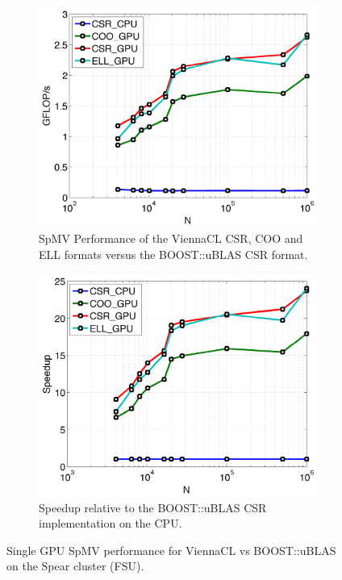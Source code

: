 \documentclass{report}
\begin{document}
\begin{figure}
\centering
\begin{subfigure}[t]{0.48\textwidth}
\centering
\includegraphics[width=1.0\textwidth]{../figures/spear_results/spmv/spmv_vcl_gflops-eps-converted-to.pdf}
\caption{SpMV Performance of the ViennaCL CSR, COO and ELL formats versus the BOOST::uBLAS CSR format. }
\label{fig:spear_vcl_gflops}
\end{subfigure} 
\begin{subfigure}[t]{0.48\textwidth}
\centering
\includegraphics[width=1.0\textwidth]{../figures/spear_results/spmv/spmv_vcl_speedup-eps-converted-to.pdf}
\caption{Speedup relative to the BOOST::uBLAS CSR implementation on the CPU.}
\label{fig:spear_vcl_speedup}
\end{subfigure} 
\caption{Single GPU SpMV performance for ViennaCL vs BOOST::uBLAS on the Spear cluster (FSU). }
\end{figure}
\end{document}
